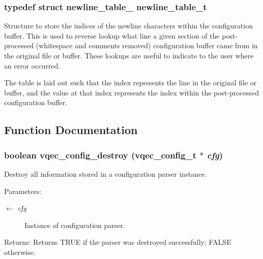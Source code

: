 \subsubsection{\setlength{\rightskip}{0pt plus 5cm}typedef struct \bf{newline\_\-table\_\-}  \bf{newline\_\-table\_\-t}}\label{vqec__config__parser_8c_96b523ccfa19a2234715d64cf8d6bb34}


Structure to store the indices of the newline characters within the configuration buffer. This is used to reverse lookup what line a given section of the post-processed (whitespace and comments removed) configuration buffer came from in the original file or buffer. These lookups are useful to indicate to the user where an error occurred.

The table is laid out such that the index represents the line in the original file or buffer, and the value at that index represents the index within the post-processed configuration buffer. 

\subsection{Function Documentation}
\subsubsection{\setlength{\rightskip}{0pt plus 5cm}boolean vqec\_\-config\_\-destroy (\bf{vqec\_\-config\_\-t} $\ast$ {\em cfg})}\label{vqec__config__parser_8c_868fff1775cba2f5be5a20d6805b7f7e}


Destroy all information stored in a configuration parser instance.

\begin{Desc}
\item[Parameters:]
\begin{description}
\item[\mbox{$\leftarrow$} {\em cfg}]Instance of configuration parser. \end{description}
\end{Desc}
\begin{Desc}
\item[Returns:]Returns TRUE if the parser was destroyed successfully; FALSE otherwise. \end{Desc}
